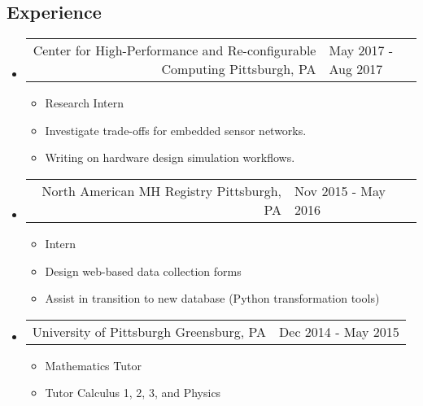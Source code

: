 \documentclass[18pt]{article}
\makeatletter
\providecommand{\tightlist}{
    \setlength{\itemsep}{0pt}\setlength{\parskip}{0pt}
}
\providecommand{\datetable}[2]{
    \begin{tabular*}{\textwidth}{r @{\extracolsep{\fill}} l}
        #1 & #2
    \end{tabular*}
}
\makeatother
\begin{document}
    \subsection*{Experience}\label{experience}
      \begin{itemize}\tightlist
        
        \item
        \datetable
            {Center for High-Performance and Re-configurable Computing \textbar{} Pittsburgh, PA}
            {May 2017 - Aug 2017}
        \begin{itemize}\tightlist
          \item Research Intern
          \item Investigate trade-offs for embedded sensor networks.
          \item Writing on hardware design simulation workflows.
      	\end{itemize}
        
        \item
        \datetable
            {North American MH Registry \textbar{} Pittsburgh, PA}
            {Nov 2015 - May 2016}
        \begin{itemize}\tightlist
          \item Intern
          \item Design web-based data collection forms
          \item Assist in transition to new database (Python transformation tools)
        \end{itemize}

        \item \datetable
            {University of Pittsburgh \textbar{} Greensburg, PA}
            {Dec 2014 - May 2015}
        \begin{itemize}\tightlist
          \item Mathematics Tutor
          \item Tutor Calculus 1, 2, 3, and Physics
        \end{itemize}
        

      \end{itemize} %
      
\end{document}
